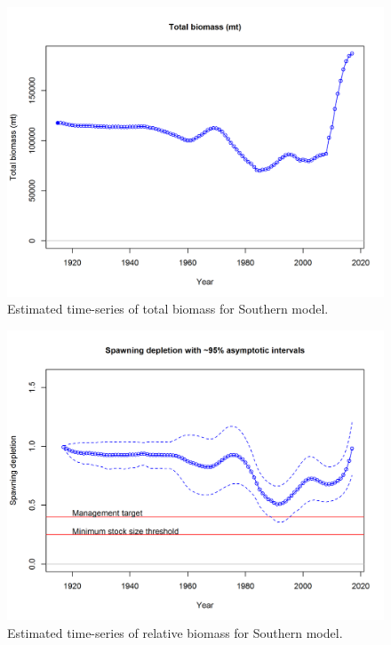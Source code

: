 \documentclass[12pt,]{article}
\begin{document}
\begin{figure}[htbp]
\centering
\includegraphics{r4ss/plots_mod2/ts1_Total_biomass_(mt).png}
\caption{Estimated time-series of total biomass for Southern model.
\label{fig:total_bio}}
\end{figure}

\FloatBarrier

\begin{figure}[htbp]
\centering
\includegraphics{r4ss/plots_mod2/ts9_Spawning_depletion_with_95_asymptotic_intervals_intervals.png}
\caption{Estimated time-series of relative biomass for Southern model.
\label{fig:depl}}
\end{figure}
\end{document}
